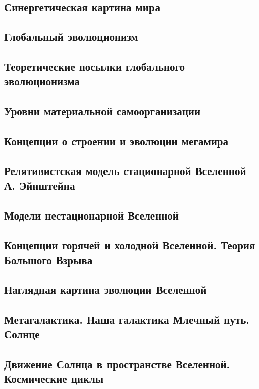 \documentclass[main.tex]{subfiles}
\begin{document}
\subsection{Синергетическая картина мира}



\subsection{Глобальный эволюционизм}


\subsection{Теоретические посылки глобального эволюционизма}


\subsection{Уровни материальной самоорганизации}


\subsection{Концепции о строении и эволюции мегамира}


\subsection{Релятивистская модель стационарной Вселенной А. Эйнштейна}


\subsection{Модели нестационарной Вселенной}


\subsection{Концепции горячей и холодной Вселенной. Теория Большого Взрыва}


\subsection{Наглядная картина эволюции Вселенной}


\subsection{Метагалактика. Наша галактика Млечный путь. Солнце}


\subsection{Движение Солнца в пространстве Вселенной. Космические циклы}

\end{document}
